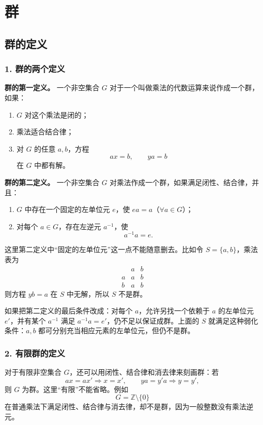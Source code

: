 \chapter{群}

\section{群的定义}

\subsection*{1. 群的两个定义}

\textbf{群的第一定义。} 一个非空集合 $G$ 对于一个叫做乘法的代数运算来说作成一个群，如果：
\begin{enumerate}[label=\Roman*.,leftmargin=3em]
\item $G$ 对这个乘法是闭的；
\item 乘法适合结合律；
\item 对 $G$ 的任意 $a,b$，方程
\[
ax=b,\qquad ya=b
\]
在 $G$ 中都有解。
\end{enumerate}

\textbf{群的第二定义。} 一个非空集合 $G$ 对乘法作成一个群，如果满足闭性、结合律，并且：
\begin{enumerate}[label=\Roman*.,leftmargin=3em,start=4]
\item $G$ 中存在一个固定的左单位元 $e$，使 $ea=a$（$\forall a\in G$）；
\item 对每个 $a\in G$，存在左逆元 $a^{-1}$，使
\[
a^{-1}a=e.
\]
\end{enumerate}

这里第二定义中“固定的左单位元”这一点不能随意删去。比如令 $S=\{a,b\}$，乘法表为
\[
\begin{array}{c|cc}
 &a&b\\\hline
 a&a&b\\
 b&a&b
\end{array}
\]
则方程 $yb=a$ 在 $S$ 中无解，所以 $S$ 不是群。

如果把第二定义的最后条件改成：对每个 $a$，允许另找一个依赖于 $a$ 的左单位元 $e'$，并有某个 $a^{-1}$ 满足 $a^{-1}a=e'$，仍不足以保证成群。上面的 $S$ 就满足这种弱化条件：$a,b$ 都可分别充当相应元素的左单位元，但仍不是群。

\subsection*{2. 有限群的定义}

对于有限非空集合 $G$，还可以用闭性、结合律和消去律来刻画群：若
\[
ax=ax'\Longrightarrow x=x',
\qquad
ya=y'a\Longrightarrow y=y',
\]
则 $G$ 为群。这里“有限”不能省略。例如
\[
G=\mathbb Z\setminus\{0\}
\]
在普通乘法下满足闭性、结合律与消去律，却不是群，因为一般整数没有乘法逆元。

